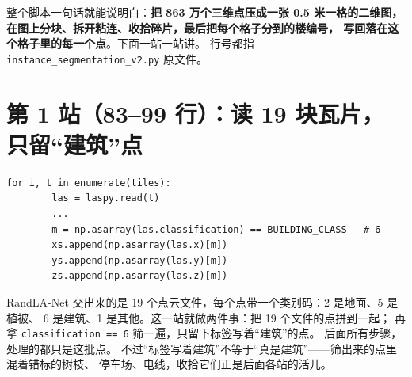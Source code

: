 \documentclass[11pt]{ctexart}
\begin{document}
\begin{center}
\end{center}

整个脚本一句话就能说明白：\textbf{把 863 万个三维点压成一张 0.5 米一格的二维图，
在图上分块、拆开粘连、收拾碎片，最后把每个格子分到的楼编号，
写回落在这个格子里的每一个点}。下面一站一站讲。
行号都指 \texttt{instance\_segmentation\_v2.py} 原文件。

\section{第 1 站（83--99 行）：读 19 块瓦片，只留``建筑''点}

\begin{lstlisting}[firstnumber=86]
    for i, t in enumerate(tiles):
        las = laspy.read(t)
        ...
        m = np.asarray(las.classification) == BUILDING_CLASS   # 6
        xs.append(np.asarray(las.x)[m])
        ys.append(np.asarray(las.y)[m])
        zs.append(np.asarray(las.z)[m])
\end{lstlisting}

\begin{whybox}
RandLA-Net 交出来的是 19 个点云文件，每个点带一个类别码：2 是地面、5 是植被、
6 是建筑、1 是其他。这一站就做两件事：把 19 个文件的点拼到一起；
再拿 \texttt{classification == 6} 筛一遍，只留下标签写着``建筑''的点。
后面所有步骤，处理的都只是这批点。
不过``标签写着建筑''不等于``真是建筑''——筛出来的点里混着错标的树枝、
停车场、电线，收拾它们正是后面各站的活儿。
\end{whybox}
\end{document}
